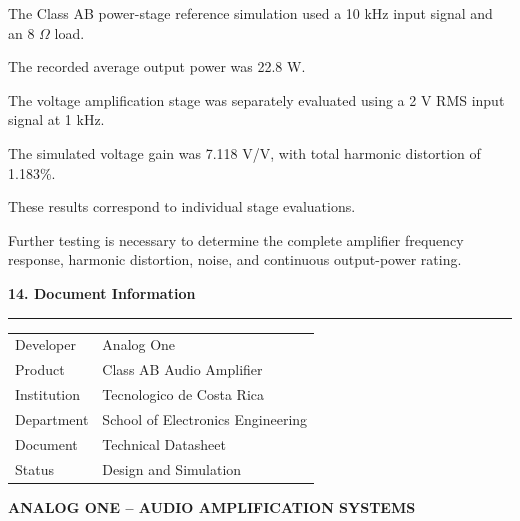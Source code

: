\documentclass[10pt,letterpaper]{article}
\newcommand{\datasheetsection}[1]{
    \vspace{0.3cm}
    {\large\bfseries\color{datasheetblue}#1}
    \par\vspace{0.1cm}
    \hrule
    \vspace{0.15cm}
}
\begin{document}
The Class AB power-stage reference
simulation used a 10 kHz input signal
and an 8 $\Omega$ load.

The recorded average output power
was 22.8 W.

The voltage amplification stage
was separately evaluated using
a 2 V RMS input signal at 1 kHz.

The simulated voltage gain was
7.118 V/V, with total harmonic
distortion of 1.183\%.

These results correspond to
individual stage evaluations.

Further testing is necessary
to determine the complete
amplifier frequency response,
harmonic distortion, noise,
and continuous output-power rating.

\datasheetsection{14. Document Information}

\begin{tabular}{ll}
\hline
Developer & Analog One\\

Product & Class AB Audio Amplifier\\

Institution & Tecnologico de Costa Rica\\

Department & School of Electronics Engineering\\

Document & Technical Datasheet\\

Status & Design and Simulation\\
\hline
\end{tabular}

\vspace{0.8cm}

\begin{center}

\textcolor{datasheetblue}{
\textbf{
ANALOG ONE -- AUDIO AMPLIFICATION SYSTEMS
}
}

\end{center}
\end{document}

